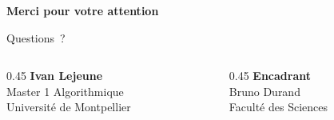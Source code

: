 \begin{frame}[plain]
  \vfill
  \centering
  {\Large\bfseries\color{umbleu} Merci pour votre attention}

  \vspace{1.5em}

  {\large Questions~?}

  \vspace{2em}


  \vspace{1.5em}

  \begin{columns}[c]
    \begin{column}{0.45\textwidth}
      \centering
      {\small \textbf{Ivan Lejeune}}\\
      {\footnotesize Master 1 Algorithmique}\\
      {\footnotesize Université de Montpellier}
    \end{column}
    \begin{column}{0.45\textwidth}
      \centering
      {\small \textbf{Encadrant}}\\
      {\footnotesize Bruno Durand}\\
      {\footnotesize Faculté des Sciences}
    \end{column}
  \end{columns}
  \vfill
\end{frame}

